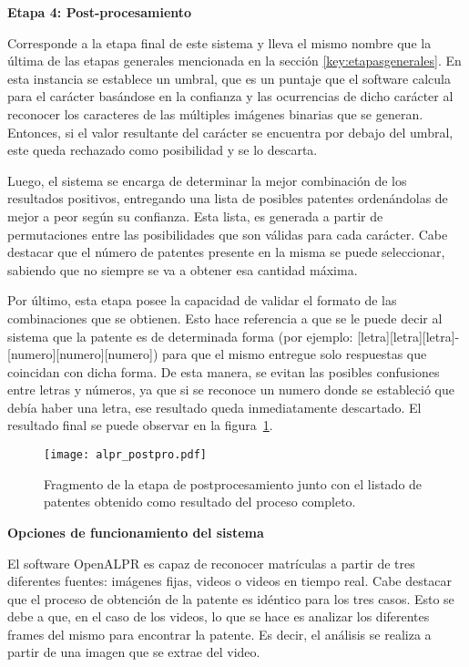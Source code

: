 \noindent \textbf{Etapa 4: Post-procesamiento}

Corresponde a la etapa final de este sistema y lleva el mismo nombre que la última de las etapas generales mencionada en la sección \ref{key:etapasgenerales}. En esta instancia se establece un umbral, que es un puntaje que el software calcula para el carácter basándose en la confianza y las ocurrencias de dicho carácter al reconocer los caracteres de las múltiples imágenes binarias que se generan. Entonces, si el valor resultante del carácter se encuentra por debajo del umbral, este queda rechazado como posibilidad y se lo descarta.

Luego, el sistema se encarga de determinar la mejor combinación de los resultados positivos, entregando una lista de posibles patentes ordenándolas de mejor a peor según su confianza. Esta lista, es generada a partir de permutaciones entre las posibilidades que son válidas para cada carácter. Cabe destacar que el número de patentes presente en la misma se puede seleccionar, sabiendo que no siempre se va a obtener esa cantidad máxima. 

Por último, esta etapa posee la capacidad de validar el formato de las combinaciones que se obtienen. Esto hace referencia a que se le puede decir al sistema que la patente es de determinada forma (por ejemplo: [letra][letra][letra]-[numero][numero][numero]) para que el mismo entregue solo respuestas que coincidan con dicha forma. De esta manera, se evitan las posibles confusiones entre letras y números, ya que si se reconoce un numero donde se estableció que debía haber una letra, ese resultado queda inmediatamente descartado.
El resultado final se puede observar en la figura~\ref{fig:img_postpro}. 

\begin{figure}[H]
	\centering
	\texttt{[image: alpr\_postpro.pdf]}
	\caption{Fragmento de la etapa de postprocesamiento junto con el listado de patentes obtenido como resultado del proceso completo.}
	\label{fig:img_postpro}
\end{figure}


\noindent \textbf{Opciones de funcionamiento del sistema}

El software OpenALPR es capaz de reconocer matrículas a partir de tres diferentes fuentes: imágenes fijas, videos o videos en tiempo real. Cabe destacar que el proceso de obtención de la patente es idéntico para los tres casos. Esto se debe a que, en el caso de los videos, lo que se hace es analizar los diferentes frames del mismo para encontrar la patente. Es decir, el análisis se realiza a partir de una imagen que se extrae del video. 

